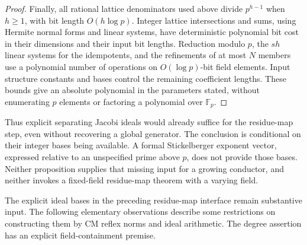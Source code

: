 \documentclass[11pt]{article}
\newcommand{\F}{\mathbb F}
\theoremstyle{definition}
\theoremstyle{remark}
\begin{document}
\begin{proof}
Finally, all rational lattice denominators used above divide
$p^{h-1}$ when $h\ge1$, with bit length $O(h\log p)$.
Integer lattice intersections and sums, using Hermite normal
forms and linear systems, have deterministic polynomial bit
cost in their dimensions and their input bit lengths.  Reduction
modulo $p$, the $sh$ linear systems for the idempotents, and
the refinements of at most $N$ members use a polynomial number
of operations on $O(\log p)$-bit field elements.  Input structure
constants and bases control the remaining coefficient lengths.
These bounds give an absolute polynomial in the parameters
stated, without enumerating $p$ elements or factoring a polynomial
over $\F_p$.
\end{proof}

Thus explicit separating Jacobi ideals would already suffice for
the residue-map step, even without recovering a global generator.
The conclusion is conditional on their integer bases being
available.  A formal Stickelberger exponent vector, expressed
relative to an unspecified prime above $p$, does not provide
those bases.  Neither proposition supplies that missing input
for a growing conductor, and neither invokes a fixed-field
residue-map theorem with a varying field.


The explicit ideal bases in the preceding residue-map interface remain
substantive input.  The following elementary observations describe some
restrictions on constructing them by CM reflex norms and ideal arithmetic.
The degree assertion has an explicit field-containment premise.
\end{document}
